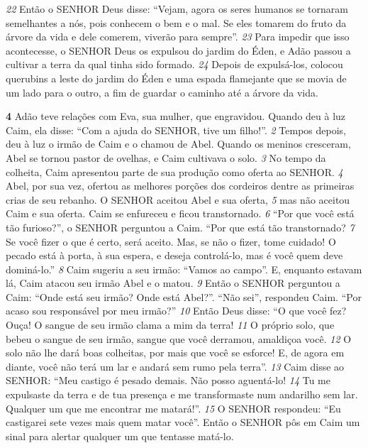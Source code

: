 \bigskip
\textit{\tiny 22}
Então o SENHOR Deus disse: “Vejam, agora os seres humanos se tornaram
semelhantes a nós, pois conhecem o bem e o mal. Se eles tomarem do fruto da
árvore da vida e dele comerem, viverão para sempre”.  
\textit{\tiny 23}
Para impedir que isso
acontecesse, o SENHOR Deus os expulsou do jardim do Éden, e Adão passou a
cultivar a terra da qual tinha sido formado.  
\textit{\tiny 24}
Depois de expulsá-los, colocou
querubins a leste do jardim do Éden e uma espada flamejante que se movia de um
lado para o outro, a fim de guardar o caminho até a árvore da vida.

\bigskip
\textbf{\large 4} 
Adão teve relações com Eva, sua mulher, que engravidou. Quando deu à luz
Caim, ela disse: “Com a ajuda do SENHOR, tive um filho!”. 
\textit{\tiny 2}
Tempos depois, deu à
luz o irmão de Caim e o chamou de Abel.
   Quando os meninos cresceram, Abel se tornou pastor de ovelhas, e Caim
cultivava o solo. 
\textit{\tiny 3}
No tempo da colheita, Caim apresentou parte de sua produção
como oferta ao SENHOR. 
\textit{\tiny 4}
Abel, por sua vez, ofertou as melhores porções dos
cordeiros dentre as primeiras crias de seu rebanho. O SENHOR aceitou Abel e sua
oferta, 
\textit{\tiny 5}
mas não aceitou Caim e sua oferta. Caim se enfureceu e ficou
transtornado.
\textit{\tiny 6}
“Por que você está tão furioso?”, o SENHOR perguntou a Caim. “Por que está tão
transtornado? 
\textit{\tiny 7}
Se você fizer o que é certo, será aceito. Mas, se não o fizer, tome
cuidado! O pecado está à porta, à sua espera, e deseja controlá-lo, mas é você
quem deve dominá-lo.”
\textit{\tiny 8}
Caim sugeriu a seu irmão: “Vamos ao campo”. E, enquanto estavam lá, Caim
atacou seu irmão Abel e o matou.
\textit{\tiny 9}
Então o SENHOR perguntou a Caim: “Onde está seu irmão? Onde está Abel?”.
   “Não sei”, respondeu Caim. “Por acaso sou responsável por meu irmão?”
\textit{\tiny 10}
Então Deus disse: “O que você fez? Ouça! O sangue de seu irmão clama a mim
da terra!  
\textit{\tiny 11}
O próprio solo, que bebeu o sangue de seu irmão, sangue que você
derramou, amaldiçoa você.  
\textit{\tiny 12}
O solo não lhe dará boas colheitas, por mais que
você se esforce! E, de agora em diante, você não terá um lar e andará sem rumo
pela terra”.
\textit{\tiny 13}
Caim disse ao SENHOR: “Meu castigo é pesado demais. Não posso aguentá-lo!
\textit{\tiny 14}
Tu me expulsaste da terra e de tua presença e me transformaste num andarilho
sem lar. Qualquer um que me encontrar me matará!”.
\textit{\tiny 15}
O SENHOR respondeu: “Eu castigarei sete vezes mais quem matar você”. Então
o SENHOR pôs em Caim um sinal para alertar qualquer um que tentasse matá-lo.
